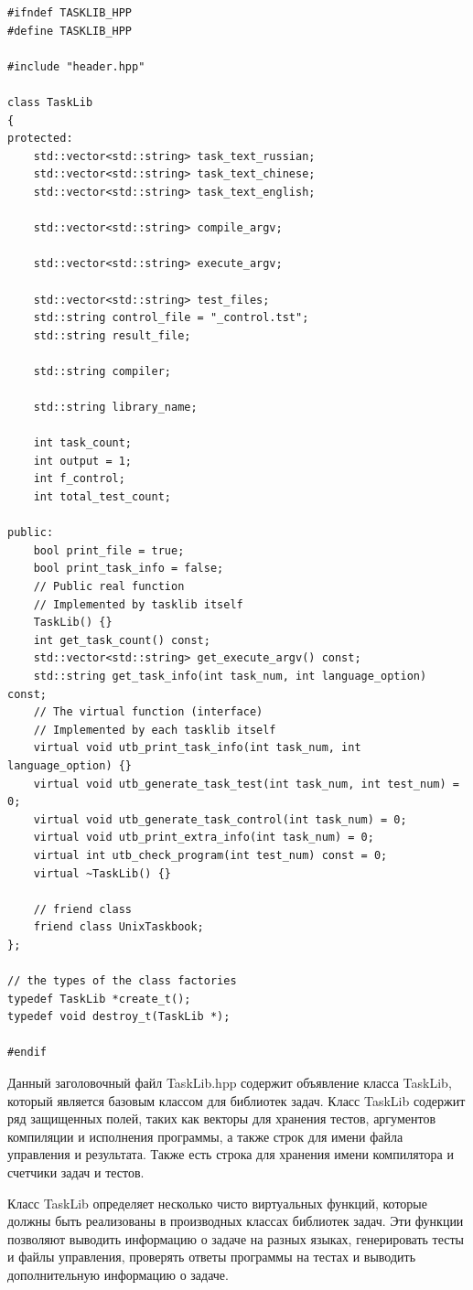 \lstset{language=c++}
\begin{lstlisting}
#ifndef TASKLIB_HPP
#define TASKLIB_HPP

#include "header.hpp"

class TaskLib
{
protected:
	std::vector<std::string> task_text_russian;
	std::vector<std::string> task_text_chinese;
	std::vector<std::string> task_text_english;

	std::vector<std::string> compile_argv;

	std::vector<std::string> execute_argv;

	std::vector<std::string> test_files;
	std::string control_file = "_control.tst";
	std::string result_file;

	std::string compiler;

	std::string library_name;

	int task_count;
	int output = 1;
	int f_control;
	int total_test_count;

public:
	bool print_file = true;		  
	bool print_task_info = false; 
	// Public real function
	// Implemented by tasklib itself
	TaskLib() {}
	int get_task_count() const;
	std::vector<std::string> get_execute_argv() const;
	std::string get_task_info(int task_num, int language_option) const;
	// The virtual function (interface)
	// Implemented by each tasklib itself
	virtual void utb_print_task_info(int task_num, int language_option) {} 
	virtual void utb_generate_task_test(int task_num, int test_num) = 0;   
	virtual void utb_generate_task_control(int task_num) = 0;
	virtual void utb_print_extra_info(int task_num) = 0;
	virtual int utb_check_program(int test_num) const = 0;
	virtual ~TaskLib() {}

	// friend class
	friend class UnixTaskbook;
};

// the types of the class factories
typedef TaskLib *create_t();
typedef void destroy_t(TaskLib *);

#endif
\end{lstlisting}

Данный заголовочный файл TaskLib.hpp содержит объявление класса TaskLib, который 
является базовым классом для библиотек задач. Класс TaskLib содержит ряд защищенных 
полей, таких как векторы для хранения тестов, аргументов компиляции и исполнения 
программы, а также строк для имени файла управления и результата. Также есть строка 
для хранения имени компилятора и счетчики задач и тестов.

Класс TaskLib определяет несколько чисто виртуальных функций, которые 
должны быть реализованы в производных классах библиотек задач. Эти 
функции позволяют выводить информацию о задаче на разных языках, генерировать 
тесты и файлы управления, проверять ответы программы на тестах и выводить дополнительную 
информацию о задаче.

